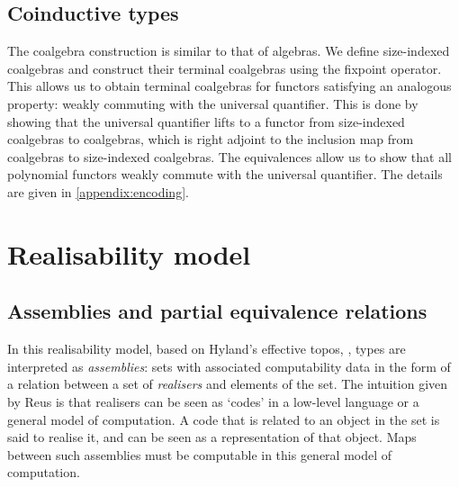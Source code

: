 \documentclass[10pt,a4paper]{article}
\theoremstyle{definition}
\theoremstyle{remark}
\renewcommand{\.}{.\,} %
\renewcommand{\:}{:} %
\newcommand{\0}{\mathbf{0}}
\newcommand{\1}{\mathbf{1}}
\newcommand\<\langle
\renewcommand\>\rangle
\theoremstyle{remark}
\begin{document}
\subsection{Coinductive types}
The coalgebra construction is similar to that of algebras. We define size-indexed coalgebras and construct their terminal coalgebras using the fixpoint operator. This allows us to obtain terminal coalgebras for functors satisfying an analogous property: weakly commuting with the universal quantifier. This is done by showing that the universal quantifier lifts to a functor from size-indexed coalgebras to coalgebras, which is right adjoint to the inclusion map from coalgebras to size-indexed coalgebras. 
The equivalences allow us to show that all polynomial functors weakly commute with the universal quantifier.
The details are given in \autoref{appendix:encoding}.

    
    \section{Realisability model}
    \label{sec:model}
    

\subsection{Assemblies and partial equivalence relations}


In this realisability model, based on Hyland's effective topos, \cite{hyland_effective_1982}, types are interpreted as \emph{assemblies}: sets with associated computability data in the form of a relation between a set of \emph{realisers} and elements of the set.
The intuition given by Reus \cite{REUS1999128} is that realisers can be seen as `codes' in a low-level language or a general model of computation. A code that is related to an object in the set is said to realise it, and can be seen as a representation of that object. Maps between such assemblies must be computable in this general model of computation. 
\end{document}
